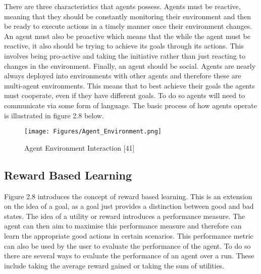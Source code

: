 \documentclass[oneside,12pt]{Classes/RoboticsLaTeX}
\begin{document}
There are three characteristics that agents possess. Agents must be reactive, meaning that they should be constantly monitoring their environment and then be ready to execute actions in a timely manner once their environment changes. An agent must also be proactive which means that the while the agent must be reactive, it also should be trying to achieve its goals through its actions. This involves being pro-active and taking the initiative rather than just reacting to changes in the environment. Finally, an agent should be social. Agents are nearly always deployed into environments with other agents and therefore these are multi-agent environments. This means that to best achieve their goals the agents must cooperate, even if they have different goals. To do so agents will need to communicate via some form of language. The basic process of how agents operate is illustrated in figure 2.8 below.

\begin{figure}[h]
\centering
\texttt{[image: Figures/Agent\_Environment.png]}
\caption{Agent Environment Interaction [41]}
\end{figure}
  
  
\subsection{Reward Based Learning}
Figure 2.8 introduces the concept of reward based learning. This is an extension on the idea of a goal, as a goal just provides a distinction between good and bad states. The idea of a utility or reward introduces a performance measure. The agent can then aim to maximise this performance measure and therefore can learn the appropriate good actions in certain scenarios. This performance metric can also be used by the user to evaluate the performance of the agent. To do so there are several ways to evaluate the performance of an agent over a run. These include taking the average reward gained or taking the sum of utilities. 
\end{document}
